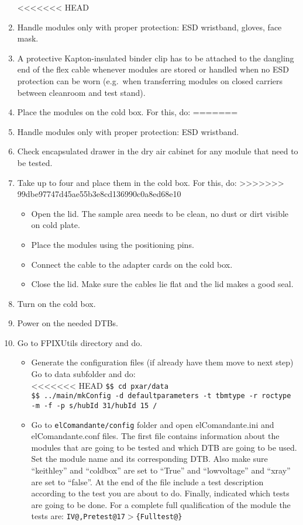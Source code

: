 \documentclass[12pt]{unlsilabsop}
\makeatletter
\newcommand{\at}{\makeatletter @\makeatother}
\makeatother
\begin{document}
\begin{enumerate}
<<<<<<< HEAD
    \item Handle modules only with proper protection: ESD wristband, gloves, face mask.
    \item A protective Kapton-insulated binder clip has to be attached to the dangling end of the flex cable whenever modules are stored or handled when no ESD protection can be worn (e.g.~when transferring modules on closed carriers between cleanroom and test stand).
    \item Place the modules on the cold box. For this, do:
=======
    \item Handle modules only with proper protection: ESD wristband.
    \item Check encapsulated drawer in the dry air cabinet for any module that need to be tested.
    \item Take up to four and place them in the cold box. For this, do:
>>>>>>> 99dbe97747d45ae55b3e8cd136990c0a8ed68e10
    \begin{itemize}
        \item Open the lid. The sample area needs to be clean, no dust or dirt visible on cold plate.
        \item Place the modules using the positioning pins.
        \item Connect the cable to the adapter cards on the cold box.
        \item Close the lid. Make sure the cables lie flat and the lid makes a good seal.
    \end{itemize}    
    \item Turn on 	the cold box. %
    \item Power on the needed DTBs.
    \item Go to FPIXUtils directory and do.
    \begin{itemize}
<<<<<<< HEAD
		\item Generate the configuration files (if already have them move to next step)\\
		Go to data subfolder and do:\\
<<<<<<< HEAD
		\texttt{\$\$ cd pxar/data}\\
		\texttt{\$\$ ../main/mkConfig -d defaultparameters -t tbmtype -r roctype -m -f -p \textsc{}s/hubId 31/hubId 15 	\textsc{}/}
		\item Go to \texttt{elComandante/config} folder and open elComandante.ini and elComandante.conf files. The first file contains information about the modules that are going to be tested and which DTB are going to be used. Set the module name and its corresponding DTB. Also make sure ``keithley'' and ``coldbox'' are set to ``True'' and ``lowvoltage'' and ``xray'' are set to ``false''. At the end of the file include a test description according to the test you are about to do. Finally, indicated which tests are going to be done. For a complete full qualification of the module the tests are: \texttt{IV\at 17,Pretest{\at}17$>$\{Fulltest\at 17\}}\\


\end{itemize}
\end{enumerate}
\end{document}
